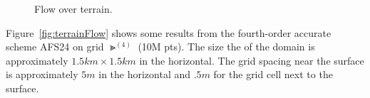 {%
\newcommand{\figWidthc}{8.0cm}
\newcommand{\trimfigc}[2]{\trimPlotb{#1}{#2}{.0}{.0}{.2}{.2}}
\newcommand{\figWidtha}{7.5cm}
\newcommand{\trimfiga}[2]{\trimPlotb{#1}{#2}{.0}{.0}{.25}{.1}}
% 
\newcommand{\figWidthb}{7.5cm}
\newcommand{\trimfigb}[2]{\trimPlotb{#1}{#2}{.0}{.0}{.05}{.1}}
% 
\begin{figure}[hbt]
\begin{center}
\end{center}
 \caption{Flow over terrain.}
  \label{fig:terrainGridAndFlow}
\end{figure}
%
}%

Figure~\ref{fig:terrainFlow} shows some results from the fourth-order accurate scheme AFS24 on grid $\Gt^{(4)}$ (10M pts).
The size the of the domain is approximately $1.5 km \times 1.5 km$ in the horizontal. 
The grid spacing near the surface is approximately $5m$ in the 
horizontal and $.5m$ for the grid cell next to the surface.


